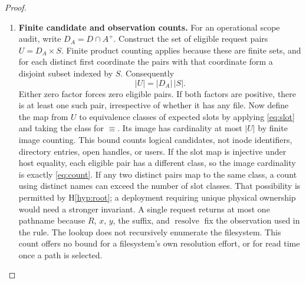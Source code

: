 \documentclass[12pt]{article}
\newcommand{\resolve}{\operatorname{resolve}}
\begin{document}
\begin{proof}
\begin{enumerate}
\item \textbf{Finite candidate and observation counts.}
For an operational scope audit, write $D_A=D\cap A^+$.
Construct the set of eligible request pairs
$U=D_A\times S$. Finite product counting applies because these
are finite sets, and for each distinct first coordinate the pairs
with that coordinate form a disjoint subset indexed by $S$.
Consequently
\begin{equation}
\label{eq:count}
 |U|=|D_A|\,|S|.
\end{equation}
Either zero factor forces zero eligible pairs. If both factors
are positive, there is at least one such pair, irrespective of
whether it has any file. Now define the map from $U$ to
equivalence classes of expected slots by applying
\eqref{eq:slot} and taking the class for $\equiv$.
Its image has cardinality at most $|U|$ by finite image
counting. This bound counts logical candidates, not inode
identifiers, directory entries, open handles, or users.
If the slot map is injective under host equality, each eligible
pair has a different class, so the image cardinality is
exactly \eqref{eq:count}. If any two distinct pairs map to
the same class, a count using distinct names can exceed the
number of slot classes. That possibility is permitted by
H\ref{hyp:root}; a deployment requiring unique physical
ownership would need a stronger invariant. A single request
returns at most one pathname because $R$, $x$, $y$, the suffix,
and $\resolve$ fix the observation used in the rule.
The lookup does not recursively enumerate the filesystem.
This count offers no bound for a filesystem's own resolution
effort, or for read time once a path is selected.


\end{enumerate}
\end{proof}
\end{document}
